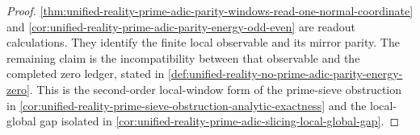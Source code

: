 \begin{proof}
\autoref{thm:unified-reality-prime-adic-parity-windows-read-one-normal-coordinate}
and
\autoref{cor:unified-reality-prime-adic-parity-energy-odd-even}
are readout calculations.  They identify the finite local observable and
its mirror parity.  The remaining claim is the incompatibility between
that observable and the completed zero ledger, stated in
\autoref{def:unified-reality-no-prime-adic-parity-energy-zero}.  This is
the second-order local-window form of the prime-sieve obstruction in
\autoref{cor:unified-reality-prime-sieve-obstruction-analytic-exactness}
and the local-global gap isolated in
\autoref{cor:unified-reality-prime-adic-slicing-local-global-gap}.
\end{proof}
